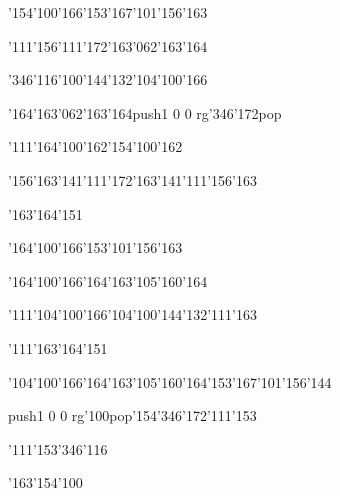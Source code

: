 \null\vfill\ipa\centerline{\enskip\enskip\enskip\enskip\char'154\char'100\char'166\enskip\char'153\char'167\char'101\char'156\char'163}\medskip\centerline{\enskip\char'111\enskip\char'156\char'111\char'172\enskip\char'163\char'062\char'163\char'164\enskip\enskip\enskip}\medskip\centerline{\enskip\enskip\enskip\enskip\enskip\enskip\enskip\enskip\enskip\enskip\enskip\enskip}\medskip\centerline{\enskip\char'346\char'116\enskip\char'100\char'144\char'132\enskip\enskip\enskip\enskip\char'104\char'100\char'166}\medskip\centerline{\enskip\enskip\enskip\enskip\enskip\enskip\enskip\enskip\enskip\enskip\enskip\char'164\char'163\char'062\char'163\char'164\enskip\pdfcolorstack\match push{1 0 0 rg}\char'346\char'172\pdfcolorstack\match pop{}}\medskip\centerline{\enskip\char'111\enskip\enskip\enskip\enskip\enskip\char'164\char'100\char'162\enskip\char'154\char'100\char'162\enskip\enskip\enskip}\medskip\centerline{\enskip\char'156\char'163\char'141\char'111\char'172\enskip\enskip\enskip\enskip\char'163\char'141\char'111\char'156\char'163\enskip\enskip\enskip}\medskip\centerline{\enskip\enskip\enskip\char'163\char'164\char'151\enskip\enskip\enskip\enskip\enskip\enskip}\medskip\centerline{\enskip\enskip\enskip\enskip\enskip\enskip\enskip\char'164\char'100\char'166\enskip\char'153\char'101\char'156\char'163}\medskip\vfill\footline{\hfil\tt\folio\hfil}\eject
\null\vfill\ipa\centerline{\enskip\enskip\enskip\enskip\char'164\char'100\char'166\enskip\char'164\char'163\char'105\char'160\char'164}\medskip\centerline{\enskip\char'111\enskip\char'104\char'100\char'166\enskip\char'104\char'100\char'144\char'132\enskip\char'111\char'163}\medskip\centerline{\enskip\char'111\enskip\char'163\char'164\char'151\enskip\enskip\enskip\enskip\enskip\enskip}\medskip\centerline{\enskip\enskip\enskip\enskip\enskip\enskip\enskip\enskip\enskip\enskip\enskip\enskip\enskip\enskip}\medskip\centerline{\enskip\char'104\char'100\char'166\enskip\char'164\char'163\char'105\char'160\char'164\enskip\char'153\char'167\char'101\char'156\char'144\enskip\enskip\enskip}\medskip\centerline{\enskip\pdfcolorstack\match push{1 0 0 rg}\char'100\pdfcolorstack\match pop{}\enskip\char'154\char'346\char'172\enskip\enskip\enskip\enskip\enskip\enskip\enskip\enskip\enskip\char'111\char'153}\medskip\centerline{\enskip\enskip\enskip\enskip\enskip\enskip\enskip\char'111\char'153\enskip\enskip\enskip\enskip\enskip\enskip\enskip\char'346\char'116}\medskip\centerline{\enskip\enskip\enskip\char'163\char'154\char'100\enskip\enskip\enskip\enskip\enskip\enskip}\medskip\centerline{\enskip\enskip\enskip\enskip\enskip\enskip\enskip\enskip\enskip\enskip\enskip\enskip\enskip\enskip\enskip}\medskip\vfill\footline{\hfil\tt\folio\hfil}\eject
